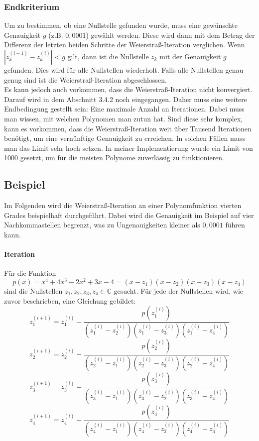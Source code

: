 \documentclass[12pt]{article}
\begin{document}
\subsubsection{Endkriterium}
Um zu bestimmen, ob eine Nullstelle gefunden wurde, muss eine gewünschte Genauigkeit $g$ (z.B. $0,0001$) gewählt werden. Diese wird dann mit dem Betrag der Differenz der letzten beiden Schritte der Weierstraß-Iteration verglichen. Wenn $|z_k^{(i-1)}-z_k^{(i)}| < g$ gilt, dann ist die Nullstelle $z_k$ mit der Genauigkeit $g$ gefunden. Dies wird für alle Nullstellen wiederholt. Falls alle Nullstellen genau genug sind ist die Weierstraß-Iteration abgeschlossen.\\
Es kann jedoch auch vorkommen, dass die Weierstraß-Iteration nicht konvergiert. Darauf wird in dem Abschnitt 3.4.2 noch eingegangen. Daher muss eine weitere Endbedingung gestellt sein: Eine maximale Anzahl an Iterationen. Dabei muss man wissen, mit welchen Polynomen man zutun hat. Sind diese sehr komplex, kann es vorkommen, dass die Weierstraß-Iteration weit über Tausend Iterationen benötigt, um eine vernünftige Genauigkeit zu erreichen. In solchen Fällen muss man das Limit sehr hoch setzen. In meiner Implementierung wurde ein Limit von 1000 gesetzt, um für die meisten Polynome zuverlässig zu funktionieren.

\subsection{Beispiel}
Im Folgenden wird die Weierstraß-Iteration an einer Polynomfunktion vierten Grades beispielhaft durchgeführt. Dabei wird die Genauigkeit im Beispiel auf vier Nachkommastellen begrenzt, was zu Ungenauigkeiten kleiner als $0,0001$ führen kann.
\paragraph{Iteration}
Für die Funktion
\begin{equation*}
    p(x) = x^4 + 4x^3 - 2x^2 + 3x - 4 = (x-z_1)(x-z_2)(x-z_3)(x-z_4)
\end{equation*}
sind die Nullstellen $z_1,z_2,z_3,z_4 \in \mathbb{C}$ gesucht. Für jede der Nullstellen wird, wie zuvor beschrieben, eine Gleichung gebildet:
\begin{equation*}
    z_1^{(i+1)} = z_1^{(i)}-\frac{p(z_1^{(i)})}{(z_1^{(i)}-z_2^{(i)})(z_1^{(i)}-z_3^{(i)})(z_1^{(i)}-z_4^{(i)})}
\end{equation*}
\begin{equation*}
    z_2^{(i+1)} = z_2^{(i)}-\frac{p(z_2^{(i)})}{(z_2^{(i)}-z_1^{(i)})(z_2^{(i)}-z_3^{(i)})(z_2^{(i)}-z_4^{(i)})}
\end{equation*}
\begin{equation*}
    z_3^{(i+1)} = z_3^{(i)}-\frac{p(z_3^{(i)})}{(z_3^{(i)}-z_1^{(i)})(z_3^{(i)}-z_2^{(i)})(z_3^{(i)}-z_4^{(i)})}
\end{equation*}
\begin{equation*}
    z_4^{(i+1)} = z_4^{(i)}-\frac{p(z_4^{(i)})}{(z_4^{(i)}-z_1^{(i)})(z_4^{(i)}-z_2^{(i)})(z_4^{(i)}-z_3^{(i)})}
\end{equation*}
\end{document}
